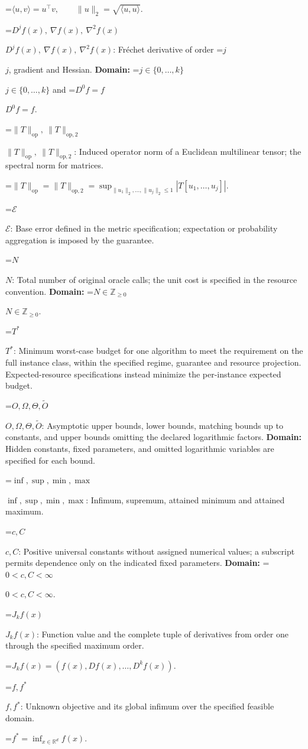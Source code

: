 \documentclass[10pt,a4paper]{article}
\newcommand{\AtlasMath}[1]{\par\begingroup\centering\setbox0=\hbox{$\displaystyle #1$}\ifdim\wd0>1.4\linewidth\typeout{ATLAS WIDE FORMULA: \the\wd0}\fi\ifdim\wd0>\linewidth\resizebox{\linewidth}{!}{\box0}\else\box0\fi\par\endgroup}
\newcommand{\AtlasInlineMath}[1]{\begingroup\setbox0=\hbox{$#1$}\ifdim\wd0>.4\linewidth\endgroup\AtlasMath{#1}\else\endgroup$#1$\fi}
\begin{document}
\AtlasMath{\langle u,v\rangle=u^\top v,\qquad\|u\|_2=\sqrt{\langle u,u\rangle}.}


\AtlasInlineMath{D^jf(x),\ \nabla f(x),\ \nabla^2f(x)}: Fréchet derivative of order \AtlasInlineMath{j}, gradient and Hessian. \textbf{Domain:} \AtlasInlineMath{j\in\{0,\ldots,k\}} and \AtlasInlineMath{D^0f=f}.

\AtlasInlineMath{\|T\|_{\mathrm{op}},\ \|T\|_{\mathrm{op},2}}: Induced operator norm of a Euclidean multilinear tensor; the spectral norm for matrices.


\AtlasMath{\|T\|_{\mathrm{op}}=\|T\|_{\mathrm{op},2}=\sup_{\|u_1\|_2,\ldots,\|u_j\|_2\le1}|T[u_1,\ldots,u_j]|.}


\AtlasInlineMath{\mathcal{E}}: Base error defined in the metric specification; expectation or probability aggregation is imposed by the guarantee.

\AtlasInlineMath{N}: Total number of original oracle calls; the unit cost is specified in the resource convention. \textbf{Domain:} \AtlasInlineMath{N\in\mathbb{Z}_{\ge0}}.

\AtlasInlineMath{T^*}: Minimum worst-case budget for one algorithm to meet the requirement on the full instance class, within the specified regime, guarantee and resource projection. Expected-resource specifications instead minimize the per-instance expected budget.

\AtlasInlineMath{O,\Omega,\Theta,\widetilde{O}}: Asymptotic upper bounds, lower bounds, matching bounds up to constants, and upper bounds omitting the declared logarithmic factors. \textbf{Domain:} Hidden constants, fixed parameters, and omitted logarithmic variables are specified for each bound.

\AtlasInlineMath{\inf,\sup,\min,\max}: Infimum, supremum, attained minimum and attained maximum.

\AtlasInlineMath{c,C}: Positive universal constants without assigned numerical values; a subscript permits dependence only on the indicated fixed parameters. \textbf{Domain:} \AtlasInlineMath{0<c,C<\infty}.

\AtlasInlineMath{J_{k}f(x)}: Function value and the complete tuple of derivatives from order one through the specified maximum order.


\AtlasMath{J_{k}f(x)=(f(x),Df(x),\ldots,D^{k}f(x)).}


\AtlasInlineMath{f,f^*}: Unknown objective and its global infimum over the specified feasible domain.


\AtlasMath{f^*=\inf_{x\in \mathbb{R}^d}f(x).}
\end{document}
